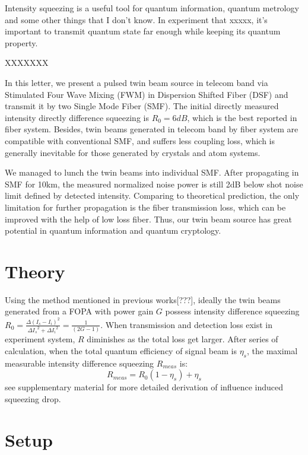 \documentclass[9pt,twocolumn,twoside]{osajnl}
\begin{document}
Intensity squeezing is a useful tool for quantum information, quantum metrology and some other things that I don't know. In experiment that xxxxx, it's important to transmit quantum state far enough while keeping its quantum property.

XXXXXXX

In this letter, we present a pulsed twin beam source in telecom band via Stimulated Four Wave Mixing (FWM) in Dispersion Shifted Fiber (DSF) and transmit it by two Single Mode Fiber (SMF). The initial directly measured intensity directly difference squeezing is $R_{0}= 6 dB$, which is the best reported in fiber system. Besides, twin beams generated in telecom band by fiber system are compatible with conventional SMF, and suffers less coupling loss, which is generally inevitable for those generated by crystals and atom systems.%

We managed to lunch the twin beams into individual SMF.
After propagating in SMF for 10km, the measured normalized noise power is still 2dB below shot noise limit defined by detected intensity. Comparing to theoretical prediction, the only limitation for further propagation is the fiber transmission loss, which can be improved with the help of low loss fiber. Thus, our twin beam source has great potential in quantum information and quantum cryptology.

\section{Theory}

Using the method mentioned in previous works\cite{guo12}[???], ideally the twin beams generated from a FOPA with power gain $G$ possess intensity difference squeezing \(R_0=\frac{\Delta{(I_s-I_i)}^2}{\Delta{I_s}^2+\Delta{I_i}^2}=\frac{1}{(2G-1)}\). 
When transmission and detection loss exist in experiment system, $R$ diminishes as the total loss get larger. 
After series of calculation, when the total quantum efficiency of signal beam is $\eta_s$, the maximal measurable intensity difference squeezing $R_{meas}$ is:
\begin{equation}
R_{meas}=R_0(1-\eta_s)+\eta_s
\label{eq:loss}
\end{equation}see supplementary material for more detailed derivation of influence induced squeezing drop.




\section{Setup}
\end{document}
